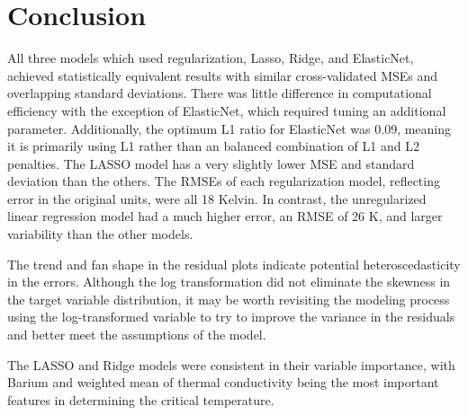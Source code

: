 \documentclass{article}      %
\begin{document}
\section{Conclusion}

All three models which used regularization, Lasso, Ridge, and ElasticNet, achieved statistically equivalent results with similar cross-validated MSEs and overlapping standard deviations. There was little difference in computational efficiency with the exception of ElasticNet, which required tuning an additional parameter. Additionally, the optimum L1 ratio for ElasticNet was 0.09, meaning it is primarily using L1 rather than an balanced combination of L1 and L2 penalties. The LASSO model has a very slightly lower MSE and standard deviation than the others. The RMSEs of each regularization model, reflecting error in the original units, were all 18 Kelvin. In contrast, the unregularized linear regression model had a much higher error, an RMSE of 26 K, and larger variability than the other models.

The trend and fan shape in the residual plots indicate potential heteroscedasticity in the errors. Although the log transformation did not eliminate the skewness in the target variable distribution, it may be worth revisiting the modeling process using the log-transformed variable to try to improve the variance in the residuals and better meet the assumptions of the model.

The LASSO and Ridge models were consistent in their variable importance, with Barium and weighted mean of thermal conductivity being the most important features in determining the critical temperature.
\end{document}
